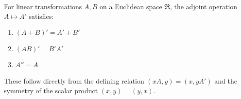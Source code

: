 For linear transformations $A, B$ on a Euclidean space $\Re$, the adjoint operation $A \mapsto A'$ satisfies:

\begin{enumerate}
\item $(A + B)' = A' + B'$
\item $(AB)' = B' A'$
\item $A'' = A$
\end{enumerate}

These follow directly from the defining relation $(xA, y) = (x, yA')$ and the symmetry of the scalar product $(x, y) = (y, x)$.
